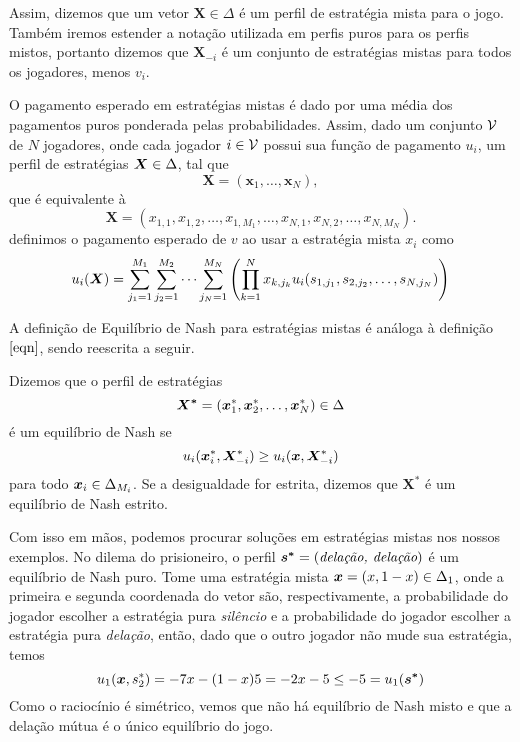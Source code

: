 Assim, dizemos que um vetor $\boldsymbol{X}\in\Delta$ é um perfil de estratégia mista para o jogo. Também iremos estender a notação utilizada em perfis puros para os perfis mistos, portanto dizemos que $\boldsymbol{X}_{-i}$ é um conjunto de estratégias mistas para todos os jogadores, menos $v_i$.

O pagamento esperado em estratégias mistas é dado por uma média dos pagamentos puros ponderada pelas probabilidades. Assim, dado um conjunto $\mathcal{V}$ de $N$ jogadores, onde cada jogador $i\in\mathcal{V}$ possui sua função de pagamento $u_i$, um perfil de estratégias $\boldsymbol{X}\in\Delta$, tal que
\begin{equation*}
    \boldsymbol{X}=(\boldsymbol{x}_1,\dots,\boldsymbol{x}_N),
\end{equation*}
que é equivalente à
\begin{equation*}
    \boldsymbol{X}=(x_{1,1},x_{1,2},\dots,x_{1,M_1},\dots,x_{N,1},x_{N,2},\dots,x_{N,M_N}).
\end{equation*}
definimos o pagamento esperado de $v$ ao usar a estratégia mista $x_i$ como
\begin{equation}
    \label{defPgtoClassico}
    u_i(\boldsymbol{X})=\sum_{j_1=1}^{M_1}\sum_{j_2=1}^{M_2}\dots\sum_{j_N=1}^{M_N}
                    \left( \prod_{k=1}^N x_{k,j_k}u_i(s_{1,j_1},s_{2,j_2},\dots,s_{N,j_N})\right)
\end{equation}

A definição de Equilíbrio de Nash para estratégias mistas é análoga à definição $\eqref{eqn}$, sendo reescrita a seguir.

\begin{definition}
    \label{DefEqNashClassico}
    Dizemos que o perfil de estratégias
    \begin{equation*}
        \boldsymbol{X^*}=(\boldsymbol{x}^*_{1},\boldsymbol{x}^*_{2},\dots,\boldsymbol{x}^*_{N})\in\Delta
    \end{equation*}
    é um equilíbrio de Nash se
    \begin{equation*}
        u_i(\boldsymbol{x}^*_i,\boldsymbol{X}^*_{-i})\geq u_i(\boldsymbol{x},\boldsymbol{X}^*_{-i})
    \end{equation*}
    para todo $\boldsymbol{x}_i\in\Delta_{M_i}$. Se a desigualdade for estrita, dizemos que $\boldsymbol{X^*}$ é um equilíbrio de Nash estrito.
\end{definition}

Com isso em mãos, podemos procurar soluções em estratégias mistas nos nossos exemplos. No dilema do prisioneiro, o perfil $\boldsymbol{s^*}=(\textit{delação, delação})$ é um equilíbrio de Nash puro. Tome uma estratégia mista $\boldsymbol{x}=(x,1-x)\in\Delta_1$, onde a primeira e segunda coordenada do vetor são, respectivamente, a probabilidade do jogador escolher a estratégia pura \textit{silêncio} e a probabilidade do jogador escolher a estratégia pura \textit{delação}, então, dado que o outro jogador não mude sua estratégia, temos
\begin{equation*}
    u_1(\boldsymbol{x},s^*_2)=-7x-(1-x)5=-2x-5\leq -5 = u_1(\boldsymbol{s^*})
\end{equation*}
Como o raciocínio é simétrico, vemos que não há equilíbrio de Nash misto e que a delação mútua é o único equilíbrio do jogo.

